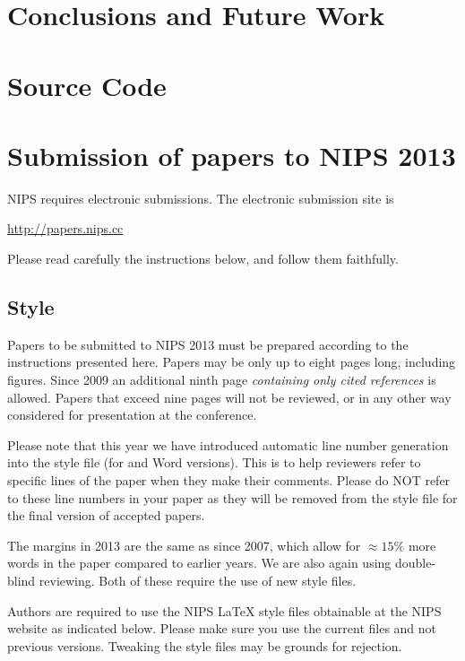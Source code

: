 \documentclass{article} %
\begin{document}
\section{Conclusions and Future Work}

\appendix

\section{Source Code}

\section{Submission of papers to NIPS 2013}

NIPS requires electronic submissions.  The electronic submission site is  
\begin{center}
   \url{http://papers.nips.cc}
\end{center}

Please read carefully the
instructions below, and follow them faithfully.
\subsection{Style}

Papers to be submitted to NIPS 2013 must be prepared according to the
instructions presented here. Papers may be only up to eight pages long,
including figures. Since 2009 an additional ninth page \textit{containing only
cited references} is allowed. Papers that exceed nine pages will not be
reviewed, or in any other way considered for presentation at the conference.

Please note that this year we have introduced automatic line number generation
into the style file (for \LaTeXe and Word versions). This is to help reviewers
refer to specific lines of the paper when they make their comments. Please do
NOT refer to these line numbers in your paper as they will be removed from the
style file for the final version of accepted papers.

The margins in 2013 are the same as since 2007, which allow for $\approx 15\%$
more words in the paper compared to earlier years. We are also again using 
double-blind reviewing. Both of these require the use of new style files.

Authors are required to use the NIPS \LaTeX{} style files obtainable at the
NIPS website as indicated below. Please make sure you use the current files and
not previous versions. Tweaking the style files may be grounds for rejection.
\end{document}
